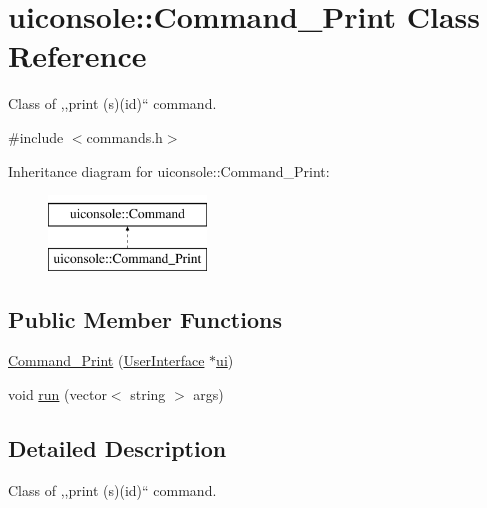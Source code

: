 \hypertarget{classuiconsole_1_1Command__Print}{
\section{uiconsole::Command\_\-Print Class Reference}
\label{df/d75/classuiconsole_1_1Command__Print}
}


Class of ,,print (s)(id)`` command.  




{\ttfamily \#include $<$commands.h$>$}

Inheritance diagram for uiconsole::Command\_\-Print:\begin{figure}[H]
\begin{center}
\leavevmode
\includegraphics[height=2.000000cm]{df/d75/classuiconsole_1_1Command__Print}
\end{center}
\end{figure}
\subsection*{Public Member Functions}
\begin{DoxyCompactItemize}
\item 
\hyperlink{classuiconsole_1_1Command__Print_a8db0b51d3232e42e9f50f55cbc3920c3}{Command\_\-Print} (\hyperlink{classUserInterface}{UserInterface} $\ast$\hyperlink{classuiconsole_1_1Command_ab43ed5152860c099f858d62f9f556699}{ui})
\item 
void \hyperlink{classuiconsole_1_1Command__Print_a42106fe7a7b5ce0c90a5a196c5f8ff42}{run} (vector$<$ string $>$ args)
\end{DoxyCompactItemize}


\subsection{Detailed Description}
Class of ,,print (s)(id)`` command. 

